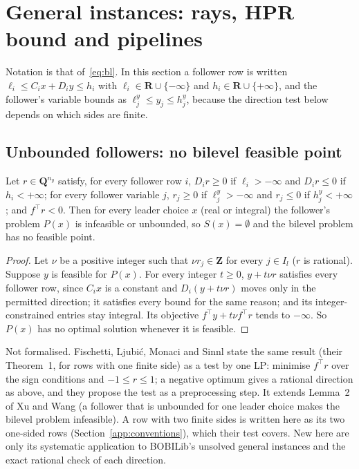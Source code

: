\section{General instances: rays, HPR bound and pipelines}\label{app:general}

Notation is that of~\eqref{eq:bl}. In this section a follower row is written
$\ell_i\le C_ix+D_iy\le h_i$ with $\ell_i\in\mathbf{R}\cup\{-\infty\}$ and
$h_i\in\mathbf{R}\cup\{+\infty\}$, and the follower's variable bounds as
$\ell^y_j\le y_j\le h^y_j$, because the direction test below depends on which
sides are finite.

\subsection{Unbounded followers: no bilevel feasible point}

\begin{theorem}\label{thm:ray}
Let $r\in\mathbf{Q}^{n_y}$ satisfy, for every follower row $i$, $D_ir\ge 0$ if
$\ell_i>-\infty$ and $D_ir\le 0$ if $h_i<+\infty$; for every follower variable
$j$, $r_j\ge 0$ if $\ell^y_j>-\infty$ and $r_j\le 0$ if $h^y_j<+\infty$; and
$f^{\top}r<0$. Then for every leader choice $x$ (real or integral) the
follower's problem $P(x)$ is infeasible or unbounded, so $S(x)=\emptyset$ and
the bilevel problem has no feasible point.
\end{theorem}
\begin{proof}
Let $\nu$ be a positive integer such that $\nu r_j\in\mathbf{Z}$ for every $j\in I_l$
($r$ is rational). Suppose $y$ is feasible for $P(x)$. For every integer
$t\ge 0$, $y+t\nu r$ satisfies every follower row, since $C_ix$ is a constant
and $D_i(y+t\nu r)$ moves only in the permitted direction; it satisfies every
bound for the same reason; and its integer-constrained entries stay integral.
Its objective $f^{\top}y+t\nu f^{\top}r$ tends to $-\infty$. So $P(x)$ has no
optimal solution whenever it is feasible.
\end{proof}
\noindent Not formalised. Fischetti, Ljubi\'c, Monaci and Sinnl state the same
result (their Theorem~1, for rows with one finite side) as a test by one LP:
minimise $f^{\top}r$ over the sign conditions and $-1\le r\le 1$; a negative
optimum gives a rational direction as above, and they propose the test as a
preprocessing step.\cite{fischetti2018intersection} It extends Lemma~2 of Xu
and Wang (a follower that is unbounded for one leader choice makes the
bilevel problem infeasible).\cite{xu2014exact} A row with two finite sides is
written here as its two one-sided rows (Section~\ref{app:conventions}), which their test
covers. New here are only its systematic application to BOBILib's unsolved
general instances and the exact rational check of each direction.

